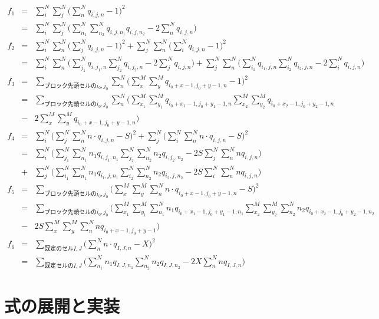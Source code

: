 \documentclass[uplatex,dvipdfmx,a4paper,11pt,oneside,openany]{jsbook}
\begin{document}
\begin{eqnarray*}
  f_1 &=& \sum_i^N\sum_j^N\bigg(\sum_n^N q_{i,j,n} - 1\bigg)^2\\
&=& \sum_i^N\sum_j^N\bigg(\sum_{n_1}^N\sum_{n_2}^N q_{i,j,n_1}q_{i,j,n_2} -2\sum_n^N q_{i,j,n} \bigg)\\
f_2 &=& \sum_i^N\sum_n^N\bigg(\sum_j^N q_{i,j,n} - 1\bigg)^2 + \sum_j^N\sum_n^N\bigg(\sum_i^N q_{i,j,n} - 1\bigg)^2\\
&=& \sum_i^N\sum_n^N\bigg(\sum_{j_1}^Nq_{i,j_1,n}\sum_{j_2}^Nq_{i,j_2,n} - 2\sum_j^N q_{i,j,n}\bigg)
 + \sum_j^N\sum_n^N\bigg(\sum_{i_1}^Nq_{i_1,j,n}\sum_{i_2}^Nq_{i_2,j,n} - 2\sum_i^N q_{i,j,n}\bigg)\\
 f_3 &=& \sum_{ブロック先頭セルのi_0,j_0}\sum_n^N\bigg(\sum_x^M\sum_y^M q_{i_0+x-1,j_0+y-1,n} - 1\bigg)^2\\
 &=& \sum_{ブロック先頭セルのi_0,j_0}\sum_n^N\bigg(\sum_{x_1}^M\sum_{y_1}^M q_{i_0+x_1-1,j_0
 +y_1-1,n}\sum_{x_2}^M\sum_{y_2}^M q_{i_0+x_2-1,j_0
 +y_2-1,n}\\
  &-& 2\sum_x^M\sum_y^M q_{i_0+x-1,j_0+y-1,n}\bigg)\\
 f_4 &=& \sum_i^N\bigg(\sum_j^N\sum_n^N n \cdot q_{i,j,n} - S\bigg)^2 + \sum_j^N\bigg(\sum_i^N\sum_n^N n \cdot q_{i,j,n} - S\bigg)^2\\
 &=& \sum_i^N\bigg(\sum_{j_1}^N\sum_{n_1}^N n_1 q_{i,j_1,n_1}\sum_{j_2}^N\sum_{n_2}^N n_2 q_{i,j_2,n_2} -2S\sum_j^N\sum_n^N n q_{i,j,n}\bigg)\\
 &+& \sum_j^N\bigg(\sum_{i_1}^N\sum_{n_1}^N n_1 q_{i_1,j,n_1}\sum_{i_2}^N\sum_{n_2}^N n_2 q_{i_2,j,n_2} -2S\sum_i^N\sum_n^N n q_{i,j,n}\bigg)\\
 f_5 &=& \sum_{ブロック先頭セルのi_0,j_0}\bigg(\sum_x^M\sum_y^M\sum_n^N n \cdot q_{i_0+x-1,j_0+y-1,n} - S\bigg)^2\\
 &=& \sum_{ブロック先頭セルのi_0,j_0}\bigg(\sum_{x_1}^M\sum_{y_1}^M\sum_{n_1}^N n_1 q_{i_0+x_1-1,j_0+y_1-1,n_1}\sum_{x_2}^M\sum_{y_2}^M\sum_{n_2}^N n_2 q_{i_0+x_2-1,j_0+y_2-1,n_2}\\
  &-& 2S\sum_x^M\sum_y^M\sum_n^N n q_{i_0+x-1,j_0+y-1}\bigg)\\
 f_6 &=& \sum_{既定のセルI,J}\bigg(\sum_n^N n \cdot q_{I,J,n} - X\bigg)^2\\
 &=& \sum_{既定セルのI,J}\bigg(\sum_{n_1}^N n_1 q_{I,J,n_1}\sum_{n_2}^N n_2 q_{I,J,n_2} - 2X\sum_n^N n q_{I,J,n}\bigg)
\end{eqnarray*}

\section{式の展開と実装}
\end{document}
